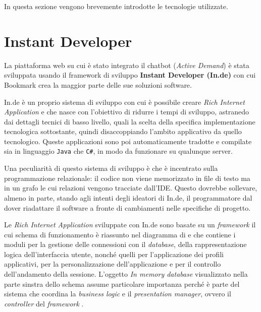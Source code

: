 In questa sezione vengono brevemente introdotte le tecnologie utilizzate.

\section{Instant Developer}
La piattaforma web su cui è stato integrato il chatbot (\textit{Active Demand}) è stata sviluppata usando il framework di sviluppo \textbf{Instant Developer (In.de)} con cui Bookmark crea la maggior parte delle sue soluzioni software.

In.de è un proprio sistema di sviluppo con cui è possibile creare \textit{Rich Internet Application} e che nasce con l'obiettivo di ridurre i tempi di sviluppo, astranedo dai dettagli tecnici di basso livello, quali la scelta della specifica implementazione tecnologica sottostante, quindi disaccoppiando l'ambito applicativo da quello tecnologico.
%
Queste applicazioni sono poi automaticamente tradotte e compilate sia in linguaggio \texttt{Java} che \texttt{C\#}, in modo da funzionare su qualunque server. 

Una peculiarità di questo sistema di sviluppo è che è incentrato sulla programmazione relazionale: il codice non viene memorizzato in file di testo ma in un grafo le cui relazioni vengono tracciate dall'IDE. 
%
Questo dovrebbe sollevare, almeno in parte, stando agli intenti degli ideatori di In.de, il programmatore dal dover riadattare il software a fronte di cambiamenti nelle specifiche di progetto.

Le \textit{Rich Internet Application} sviluppate con In.de sono basate su un \textit{framework} il cui schema di funzionamento è riassunto nel diagramma di  e che contiene i moduli per la gestione delle connessioni con il \textit{database}, della rappresentazione logica dell'interfaccia utente, nonché quelli per l'applicazione dei profili applicativi, per la personalizzazione dell'applicazione e per il controllo dell'andamento della sessione. 
%
L'oggetto \textit{In memory database} visualizzato nella parte sinstra dello schema assume particolare importanza perché è parte del sistema che coordina la \textit{business logic} e il \textit{presentation manager}, ovvero il \textit{controller} del \textit{framework} \cite{inde}.

